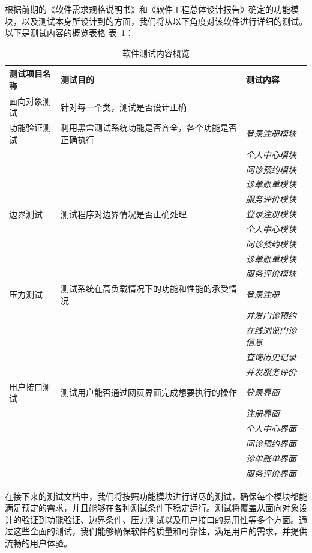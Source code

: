 根据前期的《软件需求规格说明书》和《软件工程总体设计报告》确定的功能模块，以及测试本身所设计到的方面，我们将从以下角度对该软件进行详细的测试。以下是测试内容的概览表格 表~\ref{xx}：

\begin{table}[h]
	\centering
	\begin{tabular}{|l|l|l|}
		\hline
		\textbf{测试项目名称} & \textbf{测试目的} & \textbf{测试内容} \\
		\hline
		面向对象测试 & 针对每一个类，测试是否设计正确 &  \\
		\hline
		功能验证测试 & 利用黑盒测试系统功能是否齐全，各个功能是否正确执行 & \textit{登录注册模块} \\
		& & \textit{个人中心模块} \\
		& & \textit{问诊预约模块} \\
		& & \textit{诊单账单模块} \\
		& & \textit{服务评价模块} \\
		\hline
		边界测试 & 测试程序对边界情况是否正确处理 & \textit{登录注册模块} \\
		& & \textit{个人中心模块} \\
		& & \textit{问诊预约模块} \\
		& & \textit{诊单账单模块} \\
		& & \textit{服务评价模块} \\
		\hline
		压力测试 & 测试系统在高负载情况下的功能和性能的承受情况 & \textit{登录注册} \\
		& & \textit{并发门诊预约} \\
		& & \textit{在线浏览门诊信息} \\
		& & \textit{查询历史记录} \\
		& &\textit{ 并发服务评价} \\
		\hline
		用户接口测试 & 测试用户能否通过网页界面完成想要执行的操作 &\textit{登录界面} \\
		& & \textit{注册界面} \\
		& & \textit{个人中心界面} \\
		& & \textit{问诊预约界面} \\
		& & \textit{诊单账单界面} \\
		& & \textit{服务评价界面} \\
		\hline
	\end{tabular}
	\caption{软件测试内容概览}\label{xx}
\end{table}

在接下来的测试文档中，我们将按照功能模块进行详尽的测试，确保每个模块都能满足预定的需求，并且能够在各种测试条件下稳定运行。测试将覆盖从面向对象设计的验证到功能验证、边界条件、压力测试以及用户接口的易用性等多个方面。通过这些全面的测试，我们能够确保软件的质量和可靠性，满足用户的需求，并提供流畅的用户体验。

